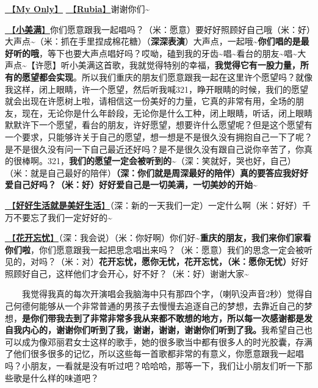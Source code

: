 \documentclass[]{ctexbook}
\begin{document}
\hyperref[my-only]{🎵【\textbf{My Only}】} \hyperref[rubia]{🎵【\textbf{Rubia}】}谢谢你们\textasciitilde{}

\hyperref[happy-ending]{🎵【\textbf{小美满}】}你们愿意跟我一起唱吗？（米：愿意）要好好照顾好自己哦（米：好）大声点\textasciitilde（米：抓在手里捏成棉花糖）（\textbf{深深表演}）大声点，一起哦\textasciitilde{}\textbf{你们唱的是最好听的哦}，等下也要大声点唱好吗？哎呦，磕到我的牙齿\textasciitilde 唱\textasciitilde 看台的朋友\textasciitilde 唱\textasciitilde 大声点\textasciitilde【许愿】听小美满这首歌，我就觉得特别的幸福，\textbf{我觉得它有一股力量，所有的愿望都会实现}。所以我们重庆的朋友们愿意跟我一起在这里许个愿望吗？就像我这样，闭上眼睛，许一个愿望，然后听我喊321，睁开眼睛的时候，我们的愿望就会出现在许愿树上啦，请相信这一份美好的力量，它真的非常有用，全场的朋友，现在，无论你是什么年龄段，无论你是什么工种，闭上眼睛，听话，闭上眼睛默默许下一个愿望，看台的朋友，许好愿望，想要许什么愿望呢？但是这个愿望有一个要求，只能够许关于自己的愿望，想一想是不是很久没有拥抱自己一下了呢？是不是很久没有问一下自己最近还好吗？是不是很久没有跟自己说你辛苦了，你真的很棒啊。321，\textbf{我们的愿望一定会被听到的\textasciitilde{}}（深：笑就好，哭也好，自己）（米：就是自己最好的陪伴）\textbf{（深：你们就是周深最好的陪伴）真的要答应我好好爱自己好吗？（米：好）好好爱自己是一切美满，一切美妙的开始\textasciitilde{}}

\hyperref[live-happy-life-happy]{🎵【\textbf{好好生活就是美好生活}】}（深：新的一天我们一定）一定什么啊（米：好好）千万不要忘了我们一定好好的\textasciitilde{}

\hyperref[no-worries]{🎵【\textbf{花开忘忧}】}（深：我会说）（米：你好啊）你们好\textasciitilde{}\textbf{重庆的朋友，我们来你们家看你们啦}，你们愿意跟我一起把思念唱出来吗？（米：愿意）我们的思念一定会被听见的，对吗？（米：对）\textbf{花开忘忧，愿你无忧，花开忘忧，（米：愿你无忧）}好好照顾好自己，这样他们才会开心，好不好？（米：好）谢谢大家\textasciitilde{}

  我觉得我真的每次开演唱会我脑海中只有那四个字，（喇叭没声音2秒）觉得自己何德何能够从一个非常普通的男孩子去慢慢去追逐自己的梦想，去靠近自己的梦想，\textbf{是你们带我去到了非常非常多我从来都不敢想的地方，所以每一次感谢都是发自我内心的，谢谢你们听到了我，谢谢，谢谢，谢谢你们听到了我。}我希望自己也可以成为像邓丽君女士这样的歌手，她的很多歌当中都有很多人的时光胶囊，存满了他们很多很多的记忆，所以这些每一首歌都非常的有意义，你愿意跟我一起唱吗？小朋友，一看就是没有听过吧？哈哈哈，那等一下，我们让小朋友们听一下那些歌是什么样的味道吧？
\end{document}
